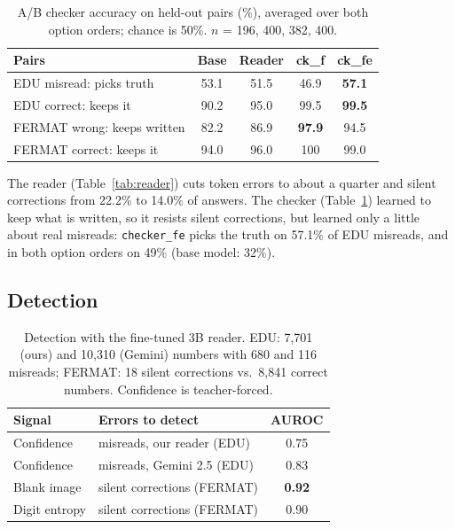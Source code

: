 \documentclass[11pt]{article}
\newcommand{\tool}[1]{\texttt{\small #1}}
\begin{document}
\begin{table}[t]
\centering\footnotesize
\setlength{\tabcolsep}{3pt}
\begin{tabular}{@{}lcccc@{}}
\toprule
Pairs & Base & Reader & ck\_f & ck\_fe \\
\midrule
EDU misread: picks truth & 53.1 & 51.5 & 46.9 & \textbf{57.1} \\
EDU correct: keeps it & 90.2 & 95.0 & 99.5 & \textbf{99.5} \\
FERMAT wrong: keeps written & 82.2 & 86.9 & \textbf{97.9} & 94.5 \\
FERMAT correct: keeps it & 94.0 & 96.0 & 100 & 99.0 \\
\bottomrule
\end{tabular}
\caption{A/B checker accuracy on held-out pairs (\%), averaged over both option orders; chance is 50\%. $n$ = 196, 400, 382, 400.}
\label{tab:checker}
\end{table}

The reader (Table~\ref{tab:reader}) cuts token errors to about a quarter and silent corrections from 22.2\% to 14.0\% of answers. The checker (Table~\ref{tab:checker}) learned to keep what is written, so it resists silent corrections, but learned only a little about real misreads: \tool{checker\_fe} picks the truth on 57.1\% of EDU misreads, and in both option orders on 49\% (base model: 32\%).

\subsection{Detection}

\begin{table}[t]
\centering\footnotesize
\setlength{\tabcolsep}{3pt}
\begin{tabular}{@{}llc@{}}
\toprule
Signal & Errors to detect & AUROC \\
\midrule
Confidence & misreads, our reader (EDU) & 0.75 \\
Confidence & misreads, Gemini 2.5 (EDU) & 0.83 \\
Blank image & silent corrections (FERMAT) & \textbf{0.92} \\
Digit entropy & silent corrections (FERMAT) & 0.90 \\
\bottomrule
\end{tabular}
\caption{Detection with the fine-tuned 3B reader. EDU: 7,701 (ours) and 10,310 (Gemini) numbers with 680 and 116 misreads; FERMAT: 18 silent corrections vs.\ 8,841 correct numbers. Confidence is teacher-forced.}
\label{tab:detect}
\end{table}
\end{document}

